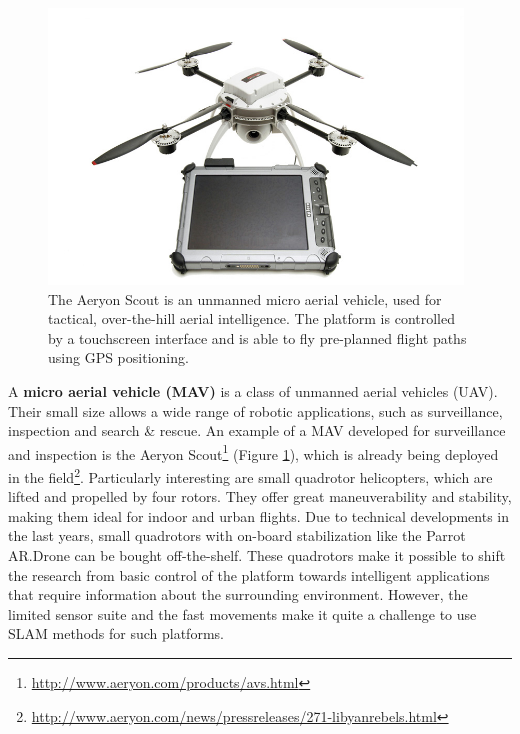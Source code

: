 \begin{figure}[htb]
\centering
\includegraphics[width=11.0cm]{images/aeryon-scout-tablet.jpg}
\caption{The Aeryon Scout is an unmanned micro aerial vehicle, used for tactical, over-the-hill aerial intelligence. The platform is controlled by a touchscreen interface and is able to fly pre-planned flight paths using GPS positioning.}
\label{fig:introduction_aeryon_scout}
\end{figure}

A \textbf{micro aerial vehicle (MAV)} is a class of unmanned aerial vehicles (UAV).
Their small size allows a wide range of robotic applications, such as surveillance, inspection and search \& rescue.
An example of a MAV developed for surveillance and inspection is the Aeryon Scout\footnote{\url{http://www.aeryon.com/products/avs.html}} (Figure \ref{fig:introduction_aeryon_scout}), which is already being deployed in the field\footnote{\url{http://www.aeryon.com/news/pressreleases/271-libyanrebels.html}}.
Particularly interesting are small quadrotor helicopters, which are lifted and propelled by four rotors.
They offer great maneuverability and stability, making them ideal for indoor and urban flights.
Due to technical developments in the last years, small quadrotors with on-board stabilization like the Parrot AR.Drone can be bought off-the-shelf.
These quadrotors make it possible to shift the research from basic control of the platform towards intelligent applications that require information about the surrounding environment.
However, the limited sensor suite and the fast movements make it quite a challenge to use SLAM methods for such platforms.



